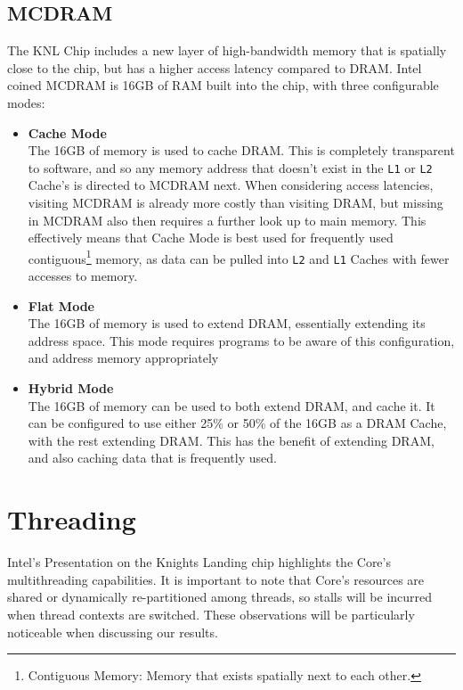 \documentclass[bsc,frontabs,twoside,singlespacing,parskip,deptreport]{infthesis}     %
\begin{document}
\subsection{MCDRAM}
The KNL Chip includes a new layer of high-bandwidth memory that is spatially close to the chip, but has a higher access latency compared to DRAM. Intel coined MCDRAM is 16GB of RAM built into the chip, with three configurable modes:

\begin{itemize}
    \item \textbf{Cache Mode} \\
    The 16GB of memory is used to cache DRAM. This is completely transparent to software, and so any memory address that doesn't exist in the \texttt{L1} or \texttt{L2} Cache's is directed to MCDRAM next. When considering access latencies, visiting MCDRAM is already more costly than visiting DRAM, but missing in MCDRAM also then requires a further look up to main memory. This effectively means that Cache Mode is best used for frequently used contiguous\footnote{Contiguous Memory: Memory that exists spatially next to each other.} memory, as data can be pulled into \texttt{L2} and \texttt{L1} Caches with fewer accesses to memory.
    
    \item \textbf{Flat Mode} \\
    The 16GB of memory is used to extend DRAM, essentially extending its address space. This mode requires programs to be aware of this configuration, and address memory appropriately
    
    \item \textbf{Hybrid Mode} \\
    The 16GB of memory can be used to both extend DRAM, and cache it. It can be configured to use either 25\% or 50\% of the 16GB as a DRAM Cache, with the rest extending DRAM. This has the benefit of extending DRAM, and also caching data that is frequently used.
\end{itemize}

\section{Threading}\label{knl-threading}
Intel's Presentation\cite{intel_pres} on the Knights Landing chip highlights the Core's multithreading capabilities. It is important to note that Core's resources are shared or dynamically re-partitioned among threads, so stalls will be incurred when thread contexts are switched. These observations will be particularly noticeable when discussing our results.
\end{document}
